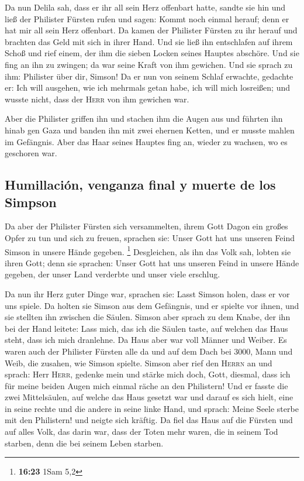  Da nun Delila sah, dass er ihr all sein Herz offenbart
hatte, sandte sie hin und ließ der Philister Fürsten rufen und sagen:
Kommt noch einmal herauf; denn er hat mir all sein Herz offenbart. Da
kamen der Philister Fürsten zu ihr herauf und brachten das Geld mit sich
in ihrer Hand.  Und sie ließ ihn entschlafen auf ihrem
Schoß und rief einem, der ihm die sieben Locken seines Hauptes abschöre.
Und sie fing an ihn zu zwingen; da war seine Kraft von ihm gewichen.
 Und sie sprach zu ihm: Philister über dir, Simson! Da er
nun von seinem Schlaf erwachte, gedachte er: Ich will ausgehen, wie ich
mehrmals getan habe, ich will mich losreißen; und wusste nicht, dass der
\textsc{Herr} von ihm gewichen war.

 Aber die Philister griffen ihn und stachen ihm die Augen
aus und führten ihn hinab gen Gaza und banden ihn mit zwei ehernen
Ketten, und er musste mahlen im Gefängnis.  Aber das Haar
seines Hauptes fing an, wieder zu wachsen, wo es geschoren war.

\hypertarget{humillaciuxf3n-venganza-final-y-muerte-de-los-simpson}{%
\subsection{Humillación, venganza final y muerte de los
Simpson}\label{humillaciuxf3n-venganza-final-y-muerte-de-los-simpson}}

 Da aber der Philister Fürsten sich versammelten, ihrem
Gott Dagon ein großes Opfer zu tun und sich zu freuen, sprachen sie:
Unser Gott hat uns unseren Feind Simson in unsere Hände gegeben.
\footnote{\textbf{16:23} 1Sam 5,2}  Desgleichen, als ihn
das Volk sah, lobten sie ihren Gott; denn sie sprachen: Unser Gott hat
uns unseren Feind in unsere Hände gegeben, der unser Land verderbte und
unser viele erschlug.

 Da nun ihr Herz guter Dinge war, sprachen sie: Lasst
Simson holen, dass er vor uns spiele. Da holten sie Simson aus dem
Gefängnis, und er spielte vor ihnen, und sie stellten ihn zwischen die
Säulen.  Simson aber sprach zu dem Knabe, der ihn bei der
Hand leitete: Lass mich, das ich die Säulen taste, auf welchen das Haus
steht, dass ich mich dranlehne.  Da Haus aber war voll
Männer und Weiber. Es waren auch der Philister Fürsten alle da und auf
dem Dach bei 3000, Mann und Weib, die zusahen, wie Simson spielte.
 Simson aber rief den \textsc{Herrn} an und sprach: Herr
\textsc{Herr}, gedenke mein und stärke mich doch, Gott, diesmal, dass
ich für meine beiden Augen mich einmal räche an den Philistern!
 Und er fasste die zwei Mittelsäulen, auf welche das Haus
gesetzt war und darauf es sich hielt, eine in seine rechte und die
andere in seine linke Hand,  und sprach: Meine Seele
sterbe mit den Philistern! und neigte sich kräftig. Da fiel das Haus auf
die Fürsten und auf alles Volk, das darin war, dass der Toten mehr
waren, die in seinem Tod starben, denn die bei seinem Leben starben.

